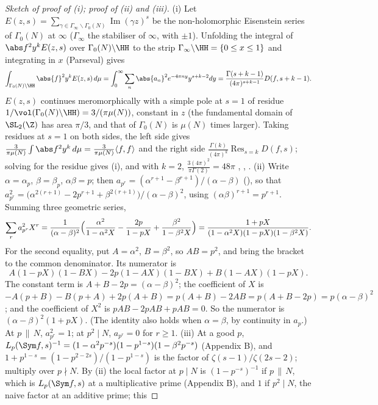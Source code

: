 \begin{proof}[Sketch of proof of (i); proof of (ii) and (iii)]
(i) Let $E(z,s)=\sum_{\gamma\in\Gamma_\infty\backslash\Gamma_0(N)}\operatorname{Im}(\gamma z)^s$ be the non-holomorphic Eisenstein series of $\Gamma_0(N)$ at $\infty$ ($\Gamma_\infty$ the stabiliser of $\infty$, with $\pm1$). Unfolding
the integral of $\abs f^2y^kE(z,s)$ over $\Gamma_0(N)\backslash\HH$ to the strip $\Gamma_\infty\backslash\HH=\{0\le x\le1\}$ and integrating in $x$ (Parseval) gives
\[
\int_{\Gamma_0(N)\backslash\HH}\abs{f}^2y^kE(z,s)\,d\mu=\int_0^\infty\sum_n\abs{a_n}^2e^{-4\pi ny}y^{s+k-2}dy=\frac{\Gamma(s+k-1)}{(4\pi)^{s+k-1}}D(f,s+k-1).
\]
$E(z,s)$ continues meromorphically with a simple pole at $s=1$ of residue $1/\vol(\Gamma_0(N)\backslash\HH)=3/(\pi\mu(N))$, constant in $z$ (the fundamental domain of $\SL_2(\Z)$ has area
$\pi/3$, and that of $\Gamma_0(N)$ is $\mu(N)$ times larger). Taking residues at $s=1$ on both sides, the left side gives $\frac3{\pi\mu(N)}\int\abs f^2y^k\,d\mu=\frac3{\pi\mu(N)}\langle f,f\rangle$ and the right
side $\frac{\Gamma(k)}{(4\pi)^k}\operatorname{Res}_{s=k}D(f,s)$; solving for the residue gives (i), and with $k=2$, $\frac{3(4\pi)^2}{\pi\Gamma(2)}=48\pi$ \cite{Rankin39}, \cite[Section 1]{Zagier85}, \cite{Shimura76}. (ii) Write $\alpha=\alpha_p$, $\beta=\beta_p$, $\alpha\beta=p$; then $a_{p^r}=(\alpha^{r+1}-\beta^{r+1})/(\alpha-\beta)$ (), so that
$a_{p^r}^2=\bigl(\alpha^{2(r+1)}-2p^{r+1}+\beta^{2(r+1)}\bigr)/(\alpha-\beta)^2$, using $(\alpha\beta)^{r+1}=p^{r+1}$. Summing three
geometric series,
\[
\sum_ra_{p^r}^2X^r=\frac1{(\alpha-\beta)^2}\Bigl(\frac{\alpha^2}{1-\alpha^2X}-\frac{2p}{1-pX}+\frac{\beta^2}{1-\beta^2X}\Bigr)=\frac{1+pX}{(1-\alpha^2X)(1-pX)(1-\beta^2X)}.
\]
For the second equality, put $A=\alpha^2$, $B=\beta^2$, so $AB=p^2$, and bring the bracket to the common denominator. Its numerator is
\[
A(1-pX)(1-BX)-2p(1-AX)(1-BX)+B(1-AX)(1-pX).
\]
The constant term is $A+B-2p=(\alpha-\beta)^2$; the coefficient of $X$ is $-A(p+B)-B(p+A)+2p(A+B)=p(A+B)-2AB=p(A+B-2p)=p(\alpha-\beta)^2$; and the coefficient of $X^2$ is
$pAB-2pAB+pAB=0$. So the numerator is $(\alpha-\beta)^2(1+pX)$. (The identity also holds when $\alpha=\beta$, by continuity in $a_p$.) At $p\,\|\,N$, $a_{p^r}^2=1$; at $p^2\mid N$, $a_{p^r}=0$ for $r\ge1$. (iii) At a good $p$,
$L_p(\Sym f,s)^{-1}=(1-\alpha^2p^{-s})(1-p^{1-s})(1-\beta^2p^{-s})$ (Appendix B), and $1+p^{1-s}=(1-p^{2-2s})/(1-p^{1-s})$ is the factor of $\zeta(s-1)/\zeta(2s-2)$; multiply over $p\nmid N$. By (ii) the
local factor at $p\mid N$ is $(1-p^{-s})^{-1}$ if $p\,\|\,N$, which is $L_p(\Sym f,s)$ at a multiplicative prime (Appendix B), and $1$ if $p^2\mid N$, the naive factor at an additive prime; this

\end{proof}
